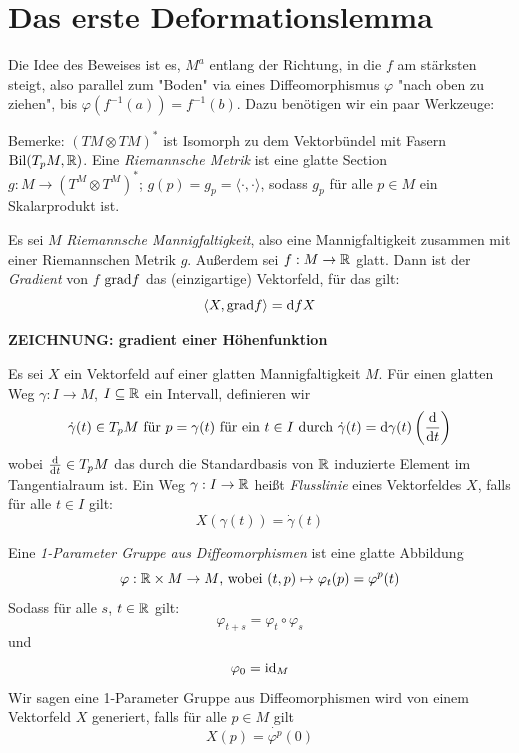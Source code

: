 \documentclass[a4paper,11pt]{article}
\begin{document}
\section{Das erste Deformationslemma}

Die Idee des Beweises ist es, $M^a$ entlang der Richtung, in die $f$ am stärksten
steigt, also parallel zum "Boden" via eines Diffeomorphismus $\varphi$ "nach oben 
zu ziehen", bis $\varphi(f^{-1}(a)) = f^{-1}(b)$. Dazu benötigen wir ein paar 
Werkzeuge:

\begin{definition}
    Bemerke: $( TM \otimes TM )^*$ ist Isomorph zu dem Vektorbündel mit Fasern 
    $\operatorname{Bil}(T_pM, { \mathbb R })$. Eine \textit{Riemannsche Metrik} ist eine glatte
    Section $g: M \to (T^M \otimes T^M)^*$; $g(p) = g_p = \langle \cdot, \cdot \rangle$, 
    sodass $g_p$ für alle $p \in M$ ein Skalarprodukt ist.
\end{definition}

\begin{definition}[Gradient]
    Es sei $M$ \textit{Riemannsche Mannigfaltigkeit}, also eine Mannigfaltigkeit
    zusammen mit einer Riemannschen Metrik $g$. Außerdem sei $f: M \to { \mathbb R }$ glatt.
    Dann ist der \textit{Gradient} von $f$ ${ \operatorname{grad} } f$ das (einzigartige) 
    Vektorfeld, für das gilt:
    \[ \langle X, { \operatorname{grad} } f \rangle = { \operatorname{d} } fX \]

    \textbf{ZEICHNUNG: gradient einer Höhenfunktion}
\end{definition}

\begin{definition}
    Es sei $X$ ein Vektorfeld auf einer glatten Mannigfaltigkeit $M$. Für einen
    glatten Weg $\gamma: I \to M$, $I \subseteq { \mathbb R }$ ein Intervall, 
    definieren wir
    \[ \dot{\gamma}(t) \in T_pM \text{ für } p = \gamma(t) \text{ für ein } t \in I \text{ durch } 
    \dot{\gamma}(t) = { \operatorname{d} } \gamma (t) \left({ \frac{{ \operatorname{d} } }{{ \operatorname{d} } t} }\right) \]
    wobei ${ \frac{{ \operatorname{d} } }{{ \operatorname{d} } t} } \in T_pM$ das durch die Standardbasis von ${ \mathbb R }$
    induzierte Element im Tangentialraum ist.
    Ein Weg $\gamma: I \to { \mathbb R }$ heißt \textit{Flusslinie} eines Vektorfeldes $X$,
    falls für alle $t \in I$ gilt:
    \[ X(\gamma(t)) = \dot{\gamma}(t) \]
\end{definition}

\begin{definition}
    Eine \textit{1-Parameter Gruppe aus Diffeomorphismen} ist eine glatte 
    Abbildung
    \[ \varphi: { \mathbb R } \times M \to M \text{, wobei } (t, p) \mapsto \varphi_t(p) = \varphi^p(t) \]
    Sodass für alle $s$, $t \in { \mathbb R }$ gilt:
    \[ \varphi_{t + s} = \varphi_t \circ \varphi_s \]
    und 
    \[ \varphi_0 = { \operatorname{id} }_M \]
    Wir sagen eine 1-Parameter Gruppe aus Diffeomorphismen wird von einem
    Vektorfeld $X$ generiert, falls für alle $p \in M$ gilt
    \[ X(p) = \dot{\varphi^p}(0) \]
\end{definition}
\end{document}
